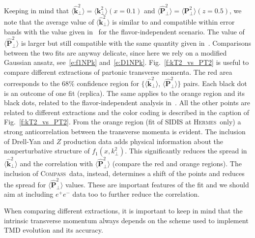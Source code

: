 \documentclass[aps,preprintnumbers,showpacs,nofootinbib,superscriptaddress,floatfix]{revtex4}
\newcommand{\AS}[1]{{\textcolor[rgb]{1,0,1}{#1}}}
\newcommand{\hermes}{\textsc{Hermes}}
\newcommand{\compass}{\textsc{Compass}}
\newcommand{\T}{\perp}
\begin{document}
Keeping in mind that $\big \langle \hat{\bm{k}}_{\T}^2 \big \rangle = \big \langle \bm{k}_{\T}^2 \big \rangle (x=0.1)$ and  $\big \langle \hat{\bm{P}}_{\perp}^2 \big \rangle = \big \langle \bm{P}_{\perp}^2 \big \rangle (z=0.5)$, we note that the average value of $\big \langle \hat{\bm{k}}_{\T}^2 \big \rangle$ is similar to and compatible within error bands with the value given in~\cite{Signori:2013mda} for the flavor-independent scenario. The value of $\big \langle \hat{\bm{P}}_{\perp}^2 \big \rangle$ is larger but still compatible with the same quantity given in~\cite{Signori:2013mda}. Comparisons between the two fits are anyway delicate, since here we rely on a modified Gaussian ansatz, see~\eqref{e:f1NPk} and~\eqref{e:D1NPk}.
Fig.~\ref{f:kT2_vs_PT2} is useful to compare \AS{different} extractions of partonic transverse momenta. The red area corresponds to the $68\%$ confidence region for $\{ \big \langle \hat{\bm{k}}_{\T}^2 \big \rangle$, $\big \langle \hat{\bm{P}}_{\perp}^2 \big \rangle \}$ pairs. Each black dot is an outcome of one fit (replica). The same applies to the orange region and its black dots, related to the flavor-independent analysis in~\cite{Signori:2013mda}. All the other points are related to different extractions and the color coding is described in the caption of Fig.~\ref{f:kT2_vs_PT2}. 
From the orange region (fit of SIDIS at \hermes\ only) a strong anticorrelation between the transverse momenta is evident. 
The inclusion of Drell-Yan and $Z$ production data adds physical information
about the nonperturbative structure of  $f_1(x,k_\perp^2)$. This significantly
reduces the spread in $\big \langle \hat{\bm{k}}_{\T}^2 \big \rangle$ and the
correlation with $\big \langle \hat{\bm{P}}_{\perp}^2 \big \rangle$ \AS{(compare the red and orange regions)}.  
The inclusion of \compass\ data, instead, determines a shift of the points and reduces the spread for $\big \langle \hat{\bm{P}}_{\perp}^2 \big \rangle$ values. 
These are important features of the fit and we should aim at including
$e^+e^-$ data too to further reduce the correlation. 

When comparing different extractions, it is important to keep in mind that the intrinsic transverse momentum always depends on the scheme used to implement TMD evolution and its accuracy. 
\end{document}
